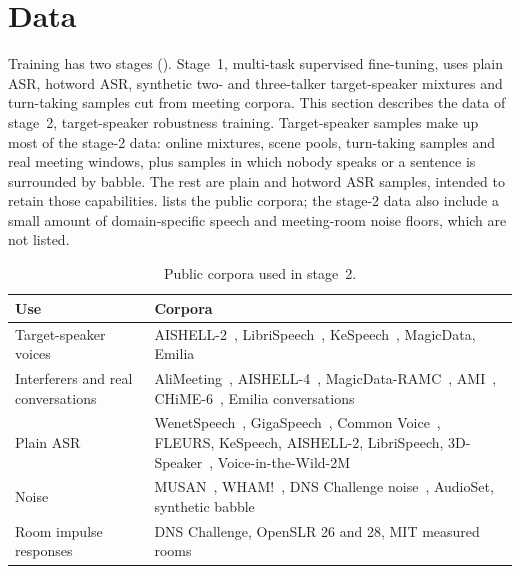 
\section{Data}
\label{sec:data}

Training has two stages ().
Stage~1, multi-task supervised fine-tuning, uses plain ASR, hotword ASR, synthetic two- and three-talker target-speaker mixtures and turn-taking samples cut from meeting corpora.
This section describes the data of stage~2, target-speaker robustness training.
Target-speaker samples make up most of the stage-2 data: online mixtures, scene pools, turn-taking samples and real meeting windows, plus samples in which nobody speaks or a sentence is surrounded by babble.
The rest are plain and hotword ASR samples, intended to retain those capabilities.
 lists the public corpora; the stage-2 data also include a small amount of domain-specific speech and meeting-room noise floors, which are not listed.

\begin{table}[t]
  \caption{Public corpora used in stage~2.}
  \label{tab:corpora}
  \centering
  \small
  \begin{tabularx}{\linewidth}{@{}>{\raggedright\arraybackslash}p{3.4cm}>{\raggedright\arraybackslash}X@{}}
    \toprule
    Use & Corpora \\
    \midrule
    Target-speaker voices & AISHELL-2~\cite{du2018aishell2}, LibriSpeech~\cite{panayotov2015librispeech}, KeSpeech~\cite{tang2021kespeech}, MagicData, Emilia~\cite{he2024emilia} \\
    Interferers and real conversations & AliMeeting~\cite{yu2022m2met}, AISHELL-4~\cite{fu2021aishell4}, MagicData-RAMC~\cite{yang2022open}, AMI~\cite{carletta2005ami}, CHiME-6~\cite{watanabe2020chime6}, Emilia conversations \\
    Plain ASR & WenetSpeech~\cite{zhang2022wenetspeech}, GigaSpeech~\cite{chen2021gigaspeech}, Common Voice~\cite{ardila2020common}, FLEURS, KeSpeech, AISHELL-2, LibriSpeech, 3D-Speaker~\cite{zheng2023speaker}, Voice-in-the-Wild-2M~\cite{xie2026megaasr} \\
    Noise & MUSAN~\cite{snyder2015musan}, WHAM!~\cite{wichern2019wham}, DNS Challenge noise~\cite{dubey2023icassp}, AudioSet, synthetic babble \\
    Room impulse responses & DNS Challenge, OpenSLR 26 and 28, MIT measured rooms~\cite{traer2016statistics} \\
    \bottomrule
  \end{tabularx}
\end{table}

